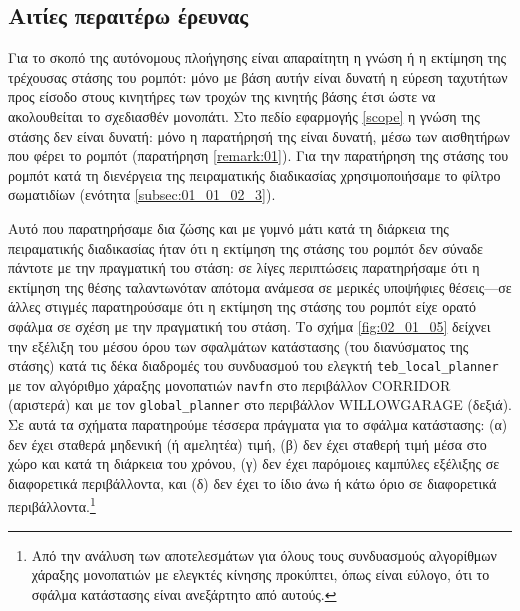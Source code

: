 \subsection{Αιτίες περαιτέρω έρευνας}
\label{subsection:02_01_05:02}

Για το σκοπό της αυτόνομους πλοήγησης είναι απαραίτητη η γνώση ή η εκτίμηση της
τρέχουσας στάσης του ρομπότ: μόνο με βάση αυτήν είναι δυνατή η εύρεση ταχυτήτων
προς είσοδο στους κινητήρες των τροχών της κινητής βάσης έτσι ώστε να
ακολουθείται το σχεδιασθέν μονοπάτι. Στο πεδίο εφαρμογής \ref{scope} η γνώση
της στάσης δεν είναι δυνατή: μόνο η παρατήρησή της είναι δυνατή, μέσω των
αισθητήρων που φέρει το ρομπότ (παρατήρηση \ref{remark:01}). Για την παρατήρηση
της στάσης του ρομπότ κατά τη διενέργεια της πειραματικής διαδικασίας
χρησιμοποιήσαμε το φίλτρο σωματιδίων (ενότητα \ref{subsec:01_01_02_3}).

Αυτό που παρατηρήσαμε δια ζώσης και με γυμνό μάτι κατά τη διάρκεια της
πειραματικής διαδικασίας ήταν ότι η εκτίμηση της στάσης του ρομπότ δεν σύναδε
πάντοτε με την πραγματική του στάση: σε λίγες περιπτώσεις παρατηρήσαμε ότι η
εκτίμηση της θέσης ταλαντωνόταν απότομα ανάμεσα σε μερικές υποψήφιες
θέσεις---σε άλλες στιγμές παρατηρούσαμε ότι η εκτίμηση της στάσης του ρομπότ
είχε ορατό σφάλμα σε σχέση με την πραγματική του στάση. Το σχήμα
\ref{fig:02_01_05} δείχνει την εξέλιξη του μέσου όρου των σφαλμάτων κατάστασης
(του διανύσματος της στάσης) κατά τις δέκα διαδρομές του συνδυασμού του ελεγκτή
\texttt{teb\_local\_planner} με τον αλγόριθμο χάραξης μονοπατιών \texttt{navfn}
στο περιβάλλον CORRIDOR (αριστερά) και με τον \texttt{global\_planner} στο
περιβάλλον WILLOWGARAGE (δεξιά). Σε αυτά τα σχήματα παρατηρούμε τέσσερα
πράγματα για το σφάλμα κατάστασης:
(α) δεν έχει σταθερά μηδενική (ή αμελητέα) τιμή,
(β) δεν έχει σταθερή τιμή μέσα στο χώρο και κατά τη διάρκεια του χρόνου,
(γ) δεν έχει παρόμοιες καμπύλες εξέλιξης σε διαφορετικά περιβάλλοντα, και
(δ) δεν έχει το ίδιο άνω ή κάτω όριο σε διαφορετικά περιβάλλοντα.\footnote{Από
την ανάλυση των αποτελεσμάτων για όλους τους συνδυασμούς αλγορίθμων χάραξης
μονοπατιών με ελεγκτές κίνησης προκύπτει, όπως είναι εύλογο, ότι το σφάλμα
κατάστασης είναι ανεξάρτητο από αυτούς.}

